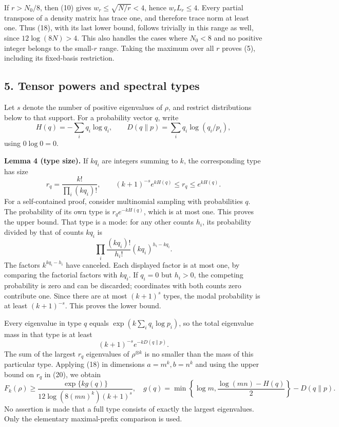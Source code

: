 \documentclass[11pt]{article}
\begin{document}
If \(r>N_0/8\), then (10) gives \(w_r\le\sqrt{N/r}<4\), hence \(w_rL_r\le4\). Every partial transpose of a density matrix has trace one, and therefore trace norm at least one. Thus (18), with its last lower bound, follows trivially in this range as well, since \(12\log(8N)>4\). This also handles the cases where \(N_0<8\) and no positive integer belongs to the small-\(r\) range. Taking the maximum over all \(r\) proves (5), including its fixed-basis restriction.

\hypertarget{tensor-powers-and-spectral-types}{%
\subsection{5. Tensor powers and spectral types}\label{tensor-powers-and-spectral-types}}

Let \(s\) denote the number of positive eigenvalues of \(\rho\), and restrict distributions below to that support. For a probability vector \(q\), write \[
 H(q)=-\sum_iq_i\log q_i,\qquad
 D(q\|p)=\sum_iq_i\log(q_i/p_i),
 \tag{19}
\] using \(0\log0=0\).

\textbf{Lemma 4 (type size).} If \(kq_i\) are integers summing to \(k\), the corresponding type has size \[
 r_q=\frac{k!}{\prod_i(kq_i)!},\qquad
 (k+1)^{-s}e^{kH(q)}\le r_q\le e^{kH(q)}.
 \tag{20}
\] For a self-contained proof, consider multinomial sampling with probabilities \(q\). The probability of its own type is \(r_q e^{-kH(q)}\), which is at most one. This proves the upper bound. That type is a mode: for any other counts \(h_i\), its probability divided by that of counts \(kq_i\) is \[
 \prod_i\frac{(kq_i)!}{h_i!}(kq_i)^{h_i-kq_i}.
\] The factors \(k^{kq_i-h_i}\) have canceled. Each displayed factor is at most one, by comparing the factorial factors with \(kq_i\). If \(q_i=0\) but \(h_i>0\), the competing probability is zero and can be discarded; coordinates with both counts zero contribute one. Since there are at most \((k+1)^s\) types, the modal probability is at least \((k+1)^{-s}\). This proves the lower bound.

Every eigenvalue in type \(q\) equals \(\exp(k\sum_iq_i\log p_i)\), so the total eigenvalue mass in that type is at least \[
 (k+1)^{-s}e^{-kD(q\|p)}.
 \tag{21}
\] The sum of the largest \(r_q\) eigenvalues of \(\rho^{\otimes k}\) is no smaller than the mass of this particular type. Applying (18) in dimensions \(a=m^k,b=n^k\) and using the upper bound on \(r_q\) in (20), we obtain \[
 F_k(\rho)\ge
 \frac{\exp\{k g(q)\}}{12\log(8(mn)^k)(k+1)^s},
 \quad
 g(q)=\min\!\left\{\log m,\frac{\log(mn)-H(q)}2\right\}-D(q\|p).
 \tag{22}
\] No assertion is made that a full type consists of exactly the largest eigenvalues. Only the elementary maximal-prefix comparison is used.
\end{document}
